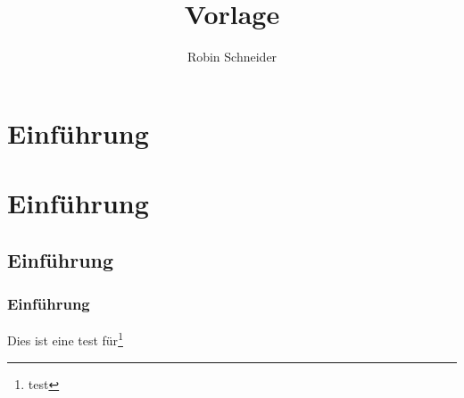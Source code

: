 \documentclass[fontsize=12pt]{scrartcl}	%
\title{Vorlage}
\author{Robin Schneider}
\begin{document}
\frontmatter%
% 
\maketitle
\tableofcontents

\section{Einführung}

\section{Einführung}
\subsection{Einführung}
\subsubsection{Einführung}
Dies ist eine test für\footnote{test}

\languagename

\printlanguage

\newpage

\appendix

\vfill
\doclicenseLicense%
\printendsignature%
\end{document}
